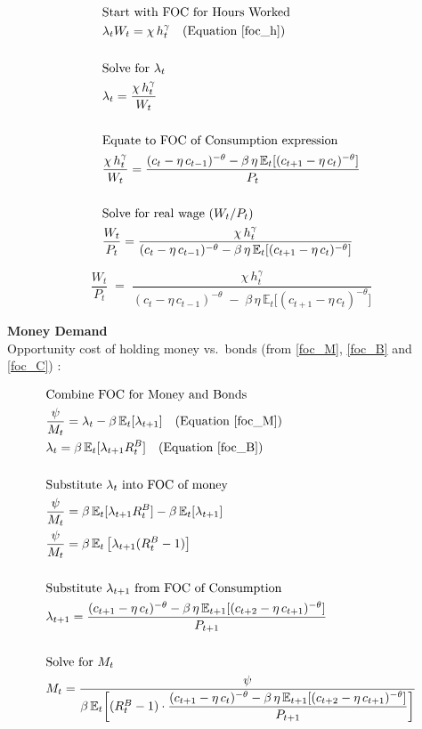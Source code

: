 \documentclass[11pt,preprint]{elsarticle}
\numberwithin{equation}{section}
\numberwithin{figure}{section}
\numberwithin{table}{section}
\begin{document}
\begin{align*}
& \text{Start with FOC for Hours Worked} \\
& \lambda_t W_t = \chi\,h_t^{\gamma} \quad \text{(Equation \ref{foc_h})} \\
& \\
& \text{Solve for } \lambda_t \\
& \lambda_t = \frac{\chi\,h_t^{\gamma}}{W_t} \\
& \\
& \text{Equate to FOC of Consumption expression} \\
& \frac{\chi\,h_t^{\gamma}}{W_t} = \frac{(c_t - \eta\,c_{t-1})^{-\theta} - \beta\,\eta\,\mathbb{E}_t[(c_{t+1} - \eta\,c_t)^{-\theta}]}{P_t} \\
& \\
& \text{Solve for real wage } (W_t/P_t) \\
& \frac{W_t}{P_t} = \frac{\chi\,h_t^{\gamma}}{(c_t - \eta\,c_{t-1})^{-\theta} - \beta\,\eta\,\mathbb{E}_t[(c_{t+1} - \eta\,c_t)^{-\theta}]}
\end{align*}

\begin{equation}\label{labourSupply_app}
\boxed{
  \frac{W_t}{P_t}
  \;=\;
  \frac{\chi\,h_t^{\gamma}}
       {(c_t - \eta\,c_{t-1})^{-\theta}
        \;-\;
        \beta\,\eta\,\mathbb{E}_t\!\bigl[(c_{t+1} - \eta\,c_t)^{-\theta}\bigr]}
}
\end{equation}

\textbf{Money Demand}\\
Opportunity cost of holding money vs.~bonds (from \eqref{foc_M},
\eqref{foc_B} and \eqref{foc_C}) :

\begin{align*}
& \text{Combine FOC for Money and Bonds} \\
& \frac{\psi}{M_t} = \lambda_t - \beta\,\mathbb{E}_t[\lambda_{t+1}] \quad \text{(Equation \ref{foc_M})} \\
& \lambda_t = \beta\,\mathbb{E}_t[\lambda_{t+1}R_t^B] \quad \text{(Equation \ref{foc_B})} \\
& \\
& \text{Substitute } \lambda_t \text{ into FOC of money} \\
& \frac{\psi}{M_t} = \beta\,\mathbb{E}_t[\lambda_{t+1}R_t^B] - \beta\,\mathbb{E}_t[\lambda_{t+1}] \\
& \frac{\psi}{M_t} = \beta\,\mathbb{E}_t\left[\lambda_{t+1}(R_t^B - 1)\right] \\
& \\
& \text{Substitute } \lambda_{t+1} \text{ from FOC of Consumption} \\
& \lambda_{t+1} = \frac{(c_{t+1} - \eta\,c_t)^{-\theta} - \beta\,\eta\,\mathbb{E}_{t+1}[(c_{t+2} - \eta\,c_{t+1})^{-\theta}]}{P_{t+1}} \\
& \\
& \text{Solve for } M_t \\
& M_t = \frac{\psi}{\beta\,\mathbb{E}_t\!\left[ (R_t^B - 1) \cdot \dfrac{(c_{t+1} - \eta\,c_t)^{-\theta} - \beta\,\eta\,\mathbb{E}_{t+1}[(c_{t+2} - \eta\,c_{t+1})^{-\theta}]}{P_{t+1}} \right]}
\end{align*}
\end{document}
